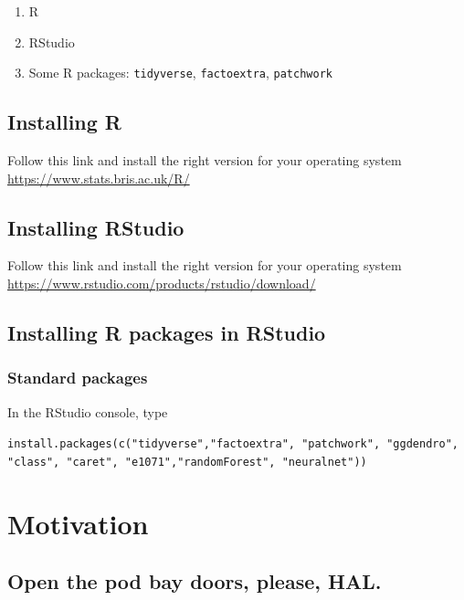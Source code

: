 \documentclass[
]{book}
\providecommand{\tightlist}{%
  \setlength{\itemsep}{0pt}\setlength{\parskip}{0pt}}
\begin{document}
\begin{enumerate}
\def\labelenumi{\arabic{enumi}.}
\tightlist
\item
  R
\item
  RStudio
\item
  Some R packages: \texttt{tidyverse}, \texttt{factoextra}, \texttt{patchwork}
\end{enumerate}

\hypertarget{installing-r}{%
\section{Installing R}\label{installing-r}}

Follow this link and install the right version for your operating system \url{https://www.stats.bris.ac.uk/R/}

\hypertarget{installing-rstudio}{%
\section{Installing RStudio}\label{installing-rstudio}}

Follow this link and install the right version for your operating system \url{https://www.rstudio.com/products/rstudio/download/}

\hypertarget{installing-r-packages-in-rstudio}{%
\section{Installing R packages in RStudio}\label{installing-r-packages-in-rstudio}}

\hypertarget{standard-packages}{%
\subsection{Standard packages}\label{standard-packages}}

In the RStudio console, type

\texttt{install.packages(c("tidyverse","factoextra",\ "patchwork",\ "ggdendro",\ "class",\ "caret",\ "e1071","randomForest",\ "neuralnet"))}

\hypertarget{motivation}{%
\chapter{Motivation}\label{motivation}}

\hypertarget{open-the-pod-bay-doors-please-hal.}{%
\section{Open the pod bay doors, please, HAL.}\label{open-the-pod-bay-doors-please-hal.}}
\end{document}
